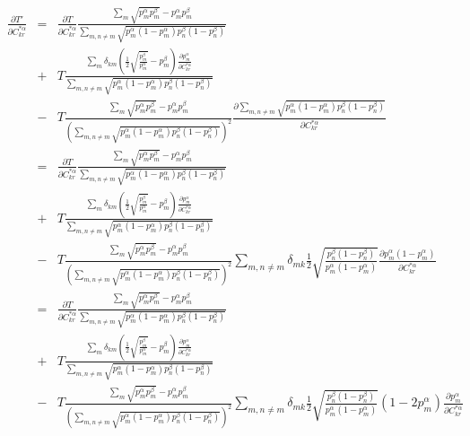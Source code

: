 \documentclass[pra,nofootinbib]{revtex4-1}
\begin{document}
\begin{eqnarray}
   \frac{\partial T'}{\partial C^{*\alpha}_{kr}}
   &=& \frac{\partial T}{\partial C^{*\alpha}_{kr}}
       \frac{\sum_{m}\sqrt{p^\alpha_m p^\beta_m}-p^\alpha_m p^\beta_m}
            {\sum_{m,n\ne m}\sqrt{p^\alpha_m(1-p^\alpha_m)p^\beta_n(1-p^\beta_n)}}
       \nonumber \\
   &+& T
       \frac{\sum_{m}\delta_{km}\left(\frac{1}{2}
             \sqrt{\frac{p^\beta_m}{p^\alpha_m}}-p^\beta_m\right)
             \frac{\partial p^\alpha_m}{\partial C^{*\alpha}_{kr}}}
            {\sum_{m,n\ne m}\sqrt{p^\alpha_m(1-p^\alpha_m)p^\beta_n(1-p^\beta_n)}}
       \nonumber \\
   &-& T
       \frac{\sum_{m}\sqrt{p^\alpha_m p^\beta_m}-p^\alpha_m p^\beta_m}
            {\left(\sum_{m,n\ne m}
                   \sqrt{p^\alpha_m(1-p^\alpha_m)p^\beta_n(1-p^\beta_n)}\right)^2}
       \frac{\partial\sum_{m,n\ne m}\sqrt{p^\alpha_m(1-p^\alpha_m)p^\beta_n(1-p^\beta_n)}}
            {\partial C^{*\alpha}_{kr}}
       \\
   &=& \frac{\partial T}{\partial C^{*\alpha}_{kr}}
       \frac{\sum_{m}\sqrt{p^\alpha_m p^\beta_m}-p^\alpha_m p^\beta_m}
            {\sum_{m,n\ne m}\sqrt{p^\alpha_m(1-p^\alpha_m)p^\beta_n(1-p^\beta_n)}}
       \nonumber \\
   &+& T
       \frac{\sum_{m}\delta_{km}\left(\frac{1}{2}
             \sqrt{\frac{p^\beta_m}{p^\alpha_m}}-p^\beta_m\right)
             \frac{\partial p^\alpha_m}{\partial C^{*\alpha}_{kr}}}
            {\sum_{m,n\ne m}\sqrt{p^\alpha_m(1-p^\alpha_m)p^\beta_n(1-p^\beta_n)}}
       \nonumber \\
   &-& T
       \frac{\sum_{m}\sqrt{p^\alpha_m p^\beta_m}-p^\alpha_m p^\beta_m}
            {\left(\sum_{m,n\ne m}
                   \sqrt{p^\alpha_m(1-p^\alpha_m)p^\beta_n(1-p^\beta_n)}\right)^2}
       \sum_{m,n\ne m}\delta_{mk}\frac{1}{2}
       \sqrt{\frac{p^\beta_n(1-p^\beta_n)}{p^\alpha_m(1-p^\alpha_m)}}
       \frac{\partial p^\alpha_m(1-p^\alpha_m)}
            {\partial C^{*\alpha}_{kr}}
       \\
   &=& \frac{\partial T}{\partial C^{*\alpha}_{kr}}
       \frac{\sum_{m}\sqrt{p^\alpha_m p^\beta_m}-p^\alpha_m p^\beta_m}
            {\sum_{m,n\ne m}\sqrt{p^\alpha_m(1-p^\alpha_m)p^\beta_n(1-p^\beta_n)}}
       \nonumber \\
   &+& T
       \frac{\sum_{m}\delta_{km}\left(\frac{1}{2}
             \sqrt{\frac{p^\beta_m}{p^\alpha_m}}-p^\beta_m\right)
             \frac{\partial p^\alpha_m}{\partial C^{*\alpha}_{kr}}}
            {\sum_{m,n\ne m}\sqrt{p^\alpha_m(1-p^\alpha_m)p^\beta_n(1-p^\beta_n)}}
       \nonumber \\
   &-& T
       \frac{\sum_{m}\sqrt{p^\alpha_m p^\beta_m}-p^\alpha_m p^\beta_m}
            {\left(\sum_{m,n\ne m}
                   \sqrt{p^\alpha_m(1-p^\alpha_m)p^\beta_n(1-p^\beta_n)}\right)^2}
       \sum_{m,n\ne m}\delta_{mk}\frac{1}{2}
       \sqrt{\frac{p^\beta_n(1-p^\beta_n)}{p^\alpha_m(1-p^\alpha_m)}}
       (1-2p^\alpha_m)\frac{\partial p^\alpha_m}
                           {\partial C^{*\alpha}_{kr}}
       \\
\end{eqnarray}
\end{document}
